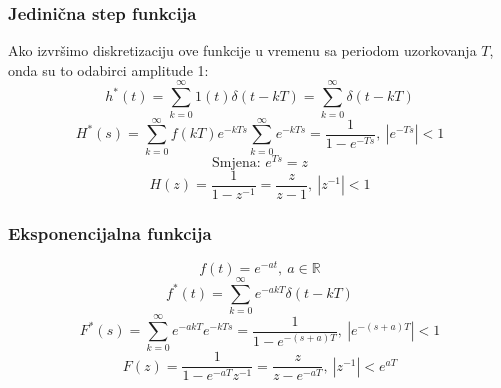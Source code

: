 \documentclass{article}
\newcommand{\suma}{\sum\limits}
\begin{document}
	\subsubsection*{Jedinična step funkcija}
	
	Ako izvršimo diskretizaciju ove funkcije u vremenu sa periodom uzorkovanja $T$, onda su to odabirci amplitude 1:
	$$h^*(t) = \suma_{k=0}^\infty 1(t)\delta(t-kT) = \suma_{k=0}^\infty \delta(t-kT)$$
	$$H^*(s) = \suma_{k=0}^\infty f(kT)e^{-kTs} \suma_{k=0}^\infty e^{-kTs} = \frac{1}{1-e^{-Ts}},\ \left|e^{-Ts}\right|<1$$
	$$\text{Smjena: }e^{Ts}=z$$
	$$H(z) = \frac{1}{1-z^{-1}} = \frac{z}{z-1},\ |z^{-1}|<1$$
	\subsubsection*{Eksponencijalna funkcija}
	$$f(t) = e^{-at},\ a \in \mathbb R$$
	$$f^*(t) = \suma_{k=0}^\infty e^{-akT} \delta(t-kT)$$
	$$F^*(s) = \suma_{k=0}^\infty e^{-akT} e^{-kTs} = \frac{1}{1-e^{-(s+a)T}},\ \left|e^{-(s+a)T}\right| < 1$$
	$$F(z) = \frac{1}{1-e^{-aT}z^{-1}} = \frac{z}{z-e^{-aT}},\ |z^{-1}| < e^{aT}$$
\end{document}
